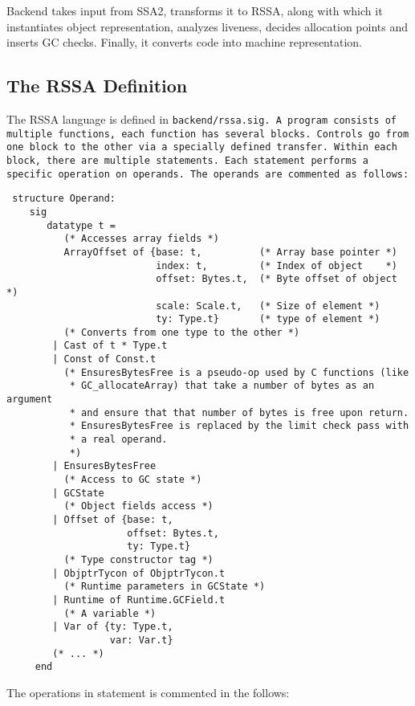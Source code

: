 Backend takes input from SSA2, transforms it to RSSA, along with which
it instantiates object representation, analyzes liveness, decides
allocation points and inserts GC checks. Finally, it converts code
into machine representation.

\subsection{The RSSA Definition}
The RSSA language is defined in \tt{backend/rssa.sig}. A program
consists of multiple functions, each function has several
blocks. Controls go from one block to the other via a specially
defined transfer. Within each block, there are multiple
statements. Each statement performs a specific operation on
operands. The operands are commented as follows:

\begin{verbatim}
 structure Operand:
    sig
       datatype t =
          (* Accesses array fields *)
          ArrayOffset of {base: t,          (* Array base pointer *)
                          index: t,         (* Index of object    *)
                          offset: Bytes.t,  (* Byte offset of object *)
                          scale: Scale.t,   (* Size of element *)
                          ty: Type.t}       (* type of element *)
          (* Converts from one type to the other *)
        | Cast of t * Type.t
        | Const of Const.t
          (* EnsuresBytesFree is a pseudo-op used by C functions (like
           * GC_allocateArray) that take a number of bytes as an argument
           * and ensure that that number of bytes is free upon return.
           * EnsuresBytesFree is replaced by the limit check pass with
           * a real operand.
           *)
        | EnsuresBytesFree
          (* Access to GC state *)
        | GCState
          (* Object fields access *)
        | Offset of {base: t,
                     offset: Bytes.t,
                     ty: Type.t}
          (* Type constructor tag *)
        | ObjptrTycon of ObjptrTycon.t
          (* Runtime parameters in GCState *)
        | Runtime of Runtime.GCField.t
          (* A variable *)
        | Var of {ty: Type.t,
                  var: Var.t}
        (* ... *)
     end
\end{verbatim}

The operations in statement is commented in the follows:

